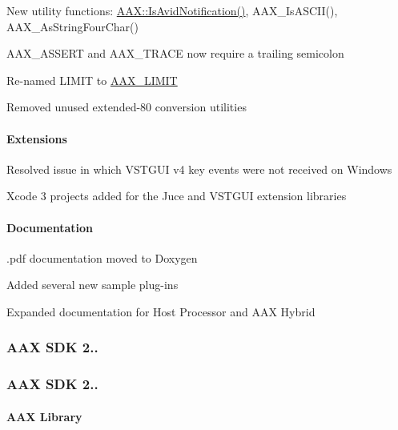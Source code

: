\begin{DoxyItemize}
\item New utility functions\+: {\ttfamily \mbox{\hyperlink{a00852_ab63efd791ab1cbbcdb004302b106c45c}{A\+A\+X\+::\+Is\+Avid\+Notification()}}}, {\ttfamily A\+A\+X\+\_\+\+Is\+A\+S\+C\+I\+I()}, {\ttfamily A\+A\+X\+\_\+\+As\+String\+Four\+Char()}  
\item A\+A\+X\+\_\+\+A\+S\+S\+E\+RT and A\+A\+X\+\_\+\+T\+R\+A\+CE now require a trailing semicolon  
\item Re-\/named {\ttfamily L\+I\+M\+IT} to \mbox{\hyperlink{a00674_af5bd671969b131ba73e1651befa4f51f}{A\+A\+X\+\_\+\+L\+I\+M\+IT}}  
\item Removed unused extended-\/80 conversion utilities  
\end{DoxyItemize}\hypertarget{a00847_aax_sdk_2p1p0_Extensions}{}\paragraph{Extensions}\label{a00847_aax_sdk_2p1p0_Extensions}

\begin{DoxyItemize}
\item Resolved issue in which V\+S\+T\+G\+UI v4 key events were not received on Windows  
\item Xcode 3 projects added for the Juce and V\+S\+T\+G\+UI extension libraries  
\end{DoxyItemize}\hypertarget{a00847_aax_sdk_2p1p0_Documentation}{}\paragraph{Documentation}\label{a00847_aax_sdk_2p1p0_Documentation}

\begin{DoxyItemize}
\item .pdf documentation moved to Doxygen  
\item Added several new sample plug-\/ins  
\item Expanded documentation for Host Processor and A\+AX Hybrid  
\end{DoxyItemize}\hypertarget{a00847_aax_sdk_2p0p1}{}\subsubsection{A\+A\+X S\+D\+K 2..}\label{a00847_aax_sdk_2p0p1}
\hypertarget{a00847_aax_sdk_2p0p0}{}\subsubsection{A\+A\+X S\+D\+K 2..}\label{a00847_aax_sdk_2p0p0}
\hypertarget{a00847_aax_sdk_2p0p0_aax}{}\paragraph{A\+A\+X Library}\label{a00847_aax_sdk_2p0p0_aax}

